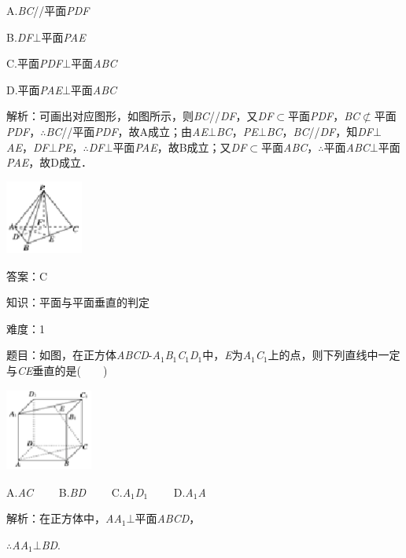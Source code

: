 \documentclass{article} %
\begin{document}
A.\textit{BC}//平面\textit{PDF}

B.\textit{DF}$\mathrm{\bot}$平面\textit{PAE}

C.平面\textit{PDF}$\mathrm{\bot}$平面\textit{ABC}

D.平面\textit{PAE}$\mathrm{\bot}$平面\textit{ABC}

解析：可画出对应图形，如图所示，则\textit{BC}//\textit{DF}，又\textit{DF}$\mathrm{\subset }$平面\textit{PDF}，\textit{BC}$\mathrm{\nsubset}$平面\textit{PDF}，$\mathrm{\therefore}$\textit{BC}//平面\textit{PDF}，故A成立；由\textit{AE}$\mathrm{\bot}$\textit{BC}，\textit{PE}$\mathrm{\bot}$\textit{BC}，\textit{BC}//\textit{DF}，知\textit{DF}$\mathrm{\bot}$\textit{AE}，\textit{DF}$\mathrm{\bot}$\textit{PE}，$\mathrm{\therefore}$\textit{DF}$\mathrm{\bot}$平面\textit{PAE}，故B成立；又\textit{DF}$\mathrm{\subset }$平面\textit{ABC}，$\mathrm{\therefore}$平面\textit{ABC}$\mathrm{\bot}$平面\textit{PAE}，故D成立．

\includegraphics*[width=1.00in, height=0.96in, keepaspectratio=false]{image211}

答案：C

知识：平面与平面垂直的判定

难度：1

题目：如图，在正方体\textit{ABCD}-\textit{A}${}_{1}$\textit{B}${}_{1}$\textit{C}${}_{1}$\textit{D}${}_{1}$中，\textit{E}为\textit{A}${}_{1}$\textit{C}${}_{1}$上的点，则下列直线中一定与\textit{CE}垂直的是(　　)

\includegraphics*[width=1.12in, height=1.07in, keepaspectratio=false]{image212}

A.\textit{AC}　　 B.\textit{BD}　　 C.\textit{A}${}_{1}$\textit{D}${}_{1}$　　 D.\textit{A}${}_{1}$\textit{A}

解析：在正方体中，\textit{AA}${}_{1}$$\mathrm{\bot}$平面\textit{ABCD}，

$\mathrm{\therefore}$\textit{AA}${}_{1}$$\mathrm{\bot}$\textit{BD}.
\end{document}
